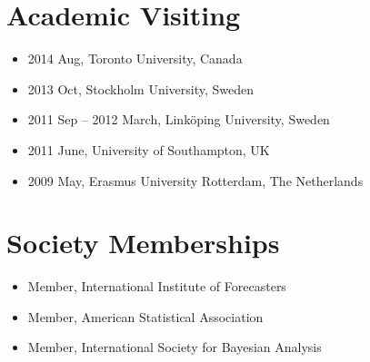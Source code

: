 \documentclass[twoside,a4paper]{article}
\begin{document}
\section*{Academic Visiting}

\begin{itemize}
\item 2014 Aug, Toronto University, Canada
\item 2013 Oct, Stockholm University, Sweden
\item 2011 Sep – 2012 March, Linköping University, Sweden
\item 2011 June, University of Southampton, UK
\item 2009 May, Erasmus University Rotterdam, The Netherlands
\end{itemize}

\section*{Society Memberships}

\begin{itemize}
\item Member, International Institute of Forecasters
\item Member, American Statistical Association
\item Member, International Society for Bayesian Analysis
\end{itemize}





\end{document}
